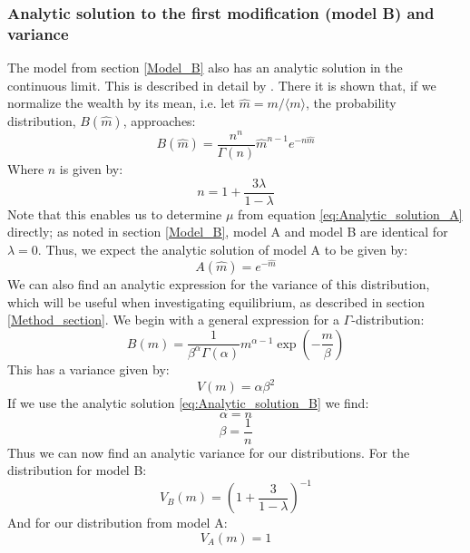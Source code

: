 \documentclass[a4paper, 10pt]{article}
\begin{document}
\subsubsection{Analytic solution to the first modification (model B) and variance}\label{variance}
The model from section \ref{Model_B} also has an analytic solution in the continuous limit. This is described in detail by \cite{Dynamics}. There it is shown that, if we normalize the wealth by its mean, i.e. let $\hat{m}=m/\langle m \rangle$, the probability distribution, $B(\hat{m})$, approaches:
\begin{equation}\label{eq:Analytic_solution_B}
B(\hat{m})=\frac{n^n}{\Gamma(n)}\hat{m}^{n-1}e^{-n\hat{m}}
\end{equation}
Where $n$ is given by:
$$n=1+\frac{3\lambda}{1-\lambda}$$
Note that this enables us to determine $\mu$ from equation \ref{eq:Analytic_solution_A} directly; as noted in section \ref{Model_B}, model A and model B are identical for $\lambda = 0$. Thus, we expect the analytic solution of model A to be given by:
\begin{equation}
A(\hat{m})=e^{-\hat{m}}
\end{equation}
We can also find an analytic expression for the variance of this distribution, which will be useful when investigating equilibrium, as described in section \ref{Method_section}. We begin with a general expression for a $\Gamma$-distribution:
\begin{equation}
B(m) = \frac{1}{\beta^{\alpha}\Gamma(\alpha)}m^{\alpha - 1}\exp\left(-\frac{m}{\beta}\right)
\end{equation}
This has a variance given by: 
\begin{equation}
V(m) = \alpha \beta^2
\end{equation}
If we use the analytic solution \ref{eq:Analytic_solution_B} we find:
\begin{equation}
\alpha = n
\end{equation}
\begin{equation}
\beta = \frac{1}{n}
\end{equation}
Thus we can now find an analytic variance for our distributions. For the distribution for model B:
\begin{equation}
V_B(m) = \left( 1 + \frac{3}{1-\lambda} \right) ^{-1}
\end{equation}
And for our distribution from model A:
\begin{equation}
V_A(m)=1
\end{equation}
\end{document}
